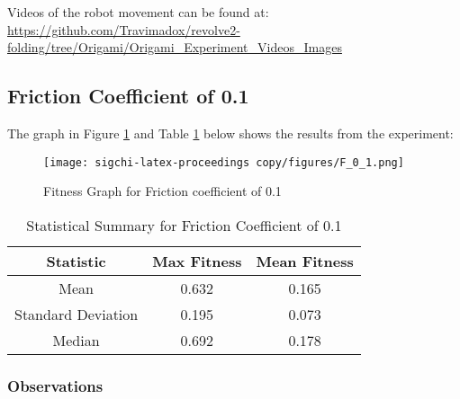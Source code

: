 \documentclass{sigchi}
\begin{document}
Videos of the robot movement can be found at: \url{https://github.com/Travimadox/revolve2-folding/tree/Origami/Origami_Experiment_Videos_Images}

\subsection{Friction Coefficient of 0.1}
The graph in Figure \ref{fig:f0.1}  and Table \ref{tab:stats_0.1}  below shows the results from the experiment:
\begin{figure}[h!]
    \centering
    \texttt{[image: sigchi-latex-proceedings copy/figures/F\_0\_1.png]}
    \caption{Fitness Graph for Friction coefficient of 0.1}
    \label{fig:f0.1}
\end{figure}

\begin{table}[h!]
\centering
\caption{Statistical Summary for Friction Coefficient of 0.1}
\label{tab:stats_0.1}
\begin{tabular}{ccc}
\hline
Statistic & Max Fitness & Mean Fitness \\
\hline
Mean & 0.632& 0.165\\
Standard Deviation & 0.195& 0.073\\
Median & 0.692& 0.178\\
\hline
\end{tabular}
\end{table}

\subsubsection{Observations}
\end{document}
